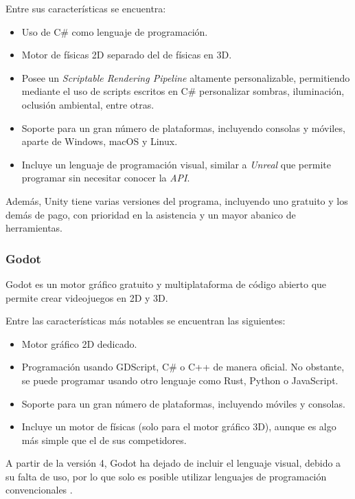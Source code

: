 \documentclass[a4paper,11pt]{book}
\begin{document}
\bigskip

Entre sus características se encuentra:

\begin{itemize}
   \item Uso de C\# como lenguaje de programación.
   \item Motor de físicas 2D separado del de físicas en 3D.
   \item Posee un \textit{Scriptable Rendering Pipeline} altamente personalizable, permitiendo mediante el uso de scripts escritos en C\# personalizar sombras, iluminación, oclusión ambiental, entre otras.
   \item Soporte para un gran número de plataformas, incluyendo consolas y móviles, aparte de Windows, macOS y Linux.
   \item Incluye un lenguaje de programación visual, similar a \textit{Unreal} que permite programar sin necesitar conocer la \textit{API}.
\end{itemize}
   
Además, Unity tiene varias versiones del programa, incluyendo uno gratuito y los demás de pago, con prioridad en la asistencia y un mayor abanico de herramientas.

\subsubsection{Godot}

Godot \cite{godot} es un motor gráfico gratuito y multiplataforma de código abierto que permite crear videojuegos en 2D y 3D. 
   
Entre las características más notables se encuentran las siguientes:

\begin{itemize}
   \item Motor gráfico 2D dedicado. 
   \item Programación usando GDScript, C\# o C++ de manera oficial. No obstante, se puede programar usando otro lenguaje como Rust, Python o JavaScript. 
   \item Soporte para un gran número de plataformas, incluyendo móviles y consolas.
   \item Incluye un motor de físicas (solo para el motor gráfico 3D), aunque es algo más simple que el de sus competidores.
\end{itemize}

\bigskip 

A partir de la versión 4, Godot ha dejado de incluir el lenguaje visual, debido a su falta de uso, por lo que solo es posible utilizar lenguajes de programación convencionales \cite{godot-no-visual}.
\end{document}
